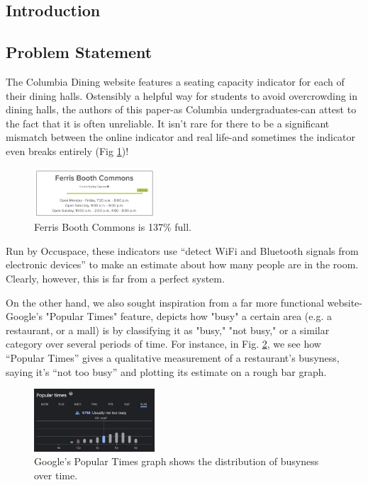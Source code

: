 \documentclass{article}
\begin{document}
\begin{multicols}{2}
\section{Introduction}
\subsection*{Problem Statement}
The Columbia Dining website features a seating capacity indicator for each of their dining halls. Ostensibly a helpful way for students to avoid overcrowding in dining halls, the authors of this paper-as Columbia undergraduates-can attest to the fact that it is often unreliable. It isn't rare for there to be a significant mismatch between the online indicator and real life-and sometimes the indicator even breaks entirely (Fig \ref{fig:fig1})!


\begin{figure}[H]
  \centering
  \includegraphics[width=0.4\textwidth]{fig1.png}
  \caption{Ferris Booth Commons is 137\% full.}
  \label{fig:fig1}
\end{figure}


Run by Occuspace, these indicators use “detect WiFi and Bluetooth signals from electronic devices” to make an estimate about how many people are in the room. Clearly, however, this is far from a perfect system.

On the other hand, we also sought inspiration from a far more functional website-Google's "Popular Times" feature, depicts how "busy" a certain area (e.g. a restaurant, or a mall) is by classifying it as "busy," "not busy," or a similar category over several periods of time. For instance, in Fig. \ref{fig:fig2}, we see how “Popular Times” gives a qualitative measurement of a restaurant's busyness, saying it's “not too busy” and plotting its estimate on a rough bar graph.

\begin{figure}[H]
  \centering
  \includegraphics[width=0.4\textwidth]{fig2.png}
  \caption{Google's Popular Times graph shows the distribution of busyness over time.}
  \label{fig:fig2}
\end{figure}



\end{multicols}
\end{document}
